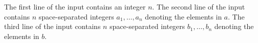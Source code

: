 The first line of the input contains an integer $n$.
The second line of the input contains $n$ space-separated integers $a_1,\ldots,a_n$ denoting the elements in $a$.
The third line of the input contains $n$ space-separated integers $b_1,\ldots,b_n$ denoting the elements in $b$.